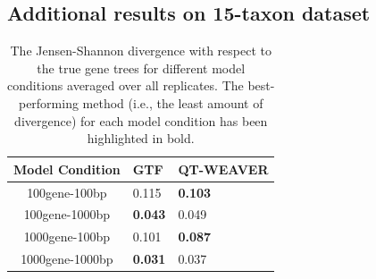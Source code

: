 \documentclass[10pt,a4paper]{article}
\begin{document}
\begin{appendices}
\newpage

\subsection{Additional results on 15-taxon dataset}
\label{app:15-taxon}



\begin{table}[h!]
    \centering
    \caption{The Jensen-Shannon divergence with respect to the true gene trees for different model conditions averaged over all replicates. The best-performing method (i.e., the least amount of divergence) for each model condition has been highlighted in bold.}
    \label{tab:15-divergence}

    \begin{tabular}{|c|C{3cm}|C{3cm}|}
        \hline
        \textbf{Model Condition} & \textbf{GTF} & \textbf{QT-WEAVER} \\
        \hline
        100gene-100bp & 0.115 & \textbf{0.103} \\
        \hline
        100gene-1000bp & \textbf{0.043} & 0.049 \\
        \hline
        1000gene-100bp & 0.101 & \textbf{0.087} \\
        \hline
        1000gene-1000bp & \textbf{0.031} & 0.037 \\
        \hline
    \end{tabular}
\end{table}


\end{appendices}
\end{document}
